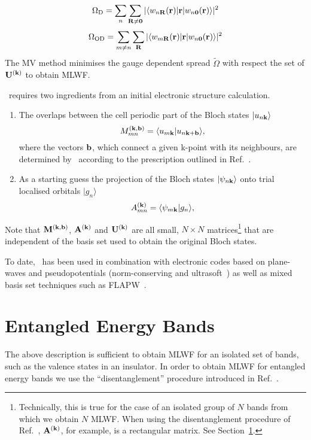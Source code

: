 \begin{equation}
\Omega_{\rm D}=\sum_n \sum_{{\bf R}\neq{\bf 0}} |\langle w_{n{\bf
    R}}({\bf r})| {\bf r} | w_{n{\bf 0}}({\bf r}) \rangle|^2 
\end{equation}
\begin{equation}
\Omega_{\rm OD}=\sum_{m\neq n} \sum_{{\bf R}} |\langle w_{m{\bf R}}({\bf
  r})| {\bf r} | w_{n{\bf 0}}({\bf r}) \rangle |^2 
\end{equation}
The MV method minimises the gauge dependent spread $\tilde{\Omega}$
with respect the set of $\mathbf{U}^{(\mathbf{k})}$ to obtain MLWF.

\wannier\ requires two ingredients from an initial electronic
structure calculation. 
\begin{enumerate}
\item The overlaps between the cell periodic part of the Bloch states
  $|u_{n{\bf k}}\rangle$  
\begin{equation}
M_{mn}^{(\bf{k,b})}=\langle u_{m{\bf k}}|u_{n{\bf k}+{\bf b}}\rangle,
\end{equation}
where the vectors ${\bf b}$, which connect a given k-point with its
neighbours, are determined by \wannier\ according to the prescription
outlined in Ref.~\cite{marzari-prb97}.
\item As a starting guess the projection of the Bloch states
  $|\psi_{n\bf{k}}\rangle$ onto trial localised orbitals $|g_{n}\rangle$ 
\begin{equation}
A_{mn}^{(\bf{k})}=\langle \psi_{m{\bf k}}|g_{n}\rangle,
\end{equation}
\end{enumerate}
Note that $\mathbf{M}^{(\mathbf{k},\mathbf{b})}$, $\mathbf{A}^{(\mathbf{k})}$ and $\mathbf{U}^{(\mathbf{k})}$ are all small, $N \times N$
matrices\footnote{Technically, this is true for the case of an
  isolated group of $N$ bands from which we obtain $N$ MLWF. When
  using the disentanglement procedure of Ref.~\cite{souza-prb01},
  $\mathbf{A}^{(\mathbf{k})}$, for example, is a rectangular matrix. See
  Section~\ref{sec:disentangle}.}  that are independent of the basis
set used to obtain the original Bloch states.

To date, \wannier\ has been used in combination with electronic codes
based on plane-waves and pseudopotentials (norm-conserving and
ultrasoft~\cite{vanderbilt-prb90}) as well as mixed basis set techniques such as
FLAPW~\cite{posternak-prb02}.

\section{Entangled Energy Bands}\label{sec:disentangle}
The above description is sufficient to obtain MLWF for an isolated set
of bands, such as the valence states in an insulator. In order to
obtain MLWF for entangled energy bands we use the ``disentanglement''
procedure introduced in Ref.~\cite{souza-prb01}.


